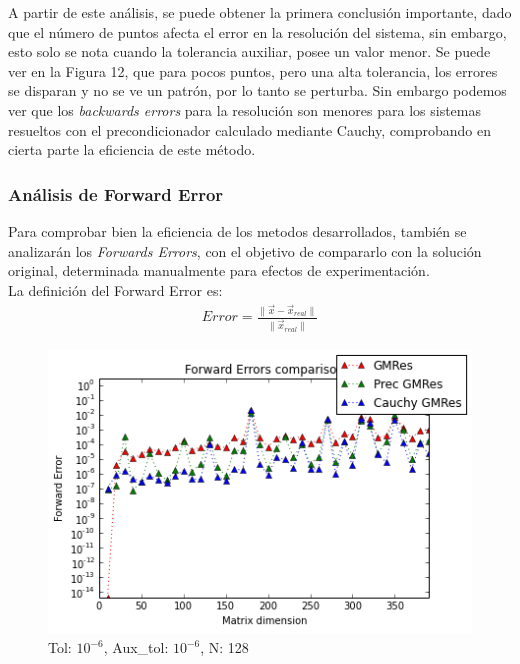 \documentclass[fleqn]{article}
\begin{document}
A partir de este análisis, se puede obtener la primera conclusión importante, dado que el número de puntos afecta el error en la resolución del sistema, sin embargo, esto solo se nota cuando la tolerancia auxiliar, posee un valor menor. Se puede ver en la Figura 12, que para pocos puntos, pero una alta tolerancia, los errores se disparan y no se ve un patrón, por lo tanto se perturba.
Sin embargo podemos ver que los \emph{backwards errors} para la resolución son menores para los sistemas resueltos con el precondicionador calculado mediante Cauchy, comprobando en cierta parte la eficiencia de este método.

\subsubsection*{Análisis de Forward Error}
Para comprobar bien la eficiencia de los metodos desarrollados, también se analizarán los \emph{Forwards Errors}, con el objetivo de compararlo con la solución original, determinada manualmente para efectos de experimentación.\\
La definición del Forward Error es:
\begin{align}
    Error = \frac{\|\vec{x}-\vec{x}_{real}\|}{\|\vec{x}_{real}\|}
\end{align}

\begin{figure}[ht]
    \centering
    \includegraphics[scale=0.4]{images/x1.png}
    \caption{Tol: $10^{-6}$, Aux\_tol: $10^{-6}$, N: 128}
    \label{fig:13}
\end{figure}
\end{document}
